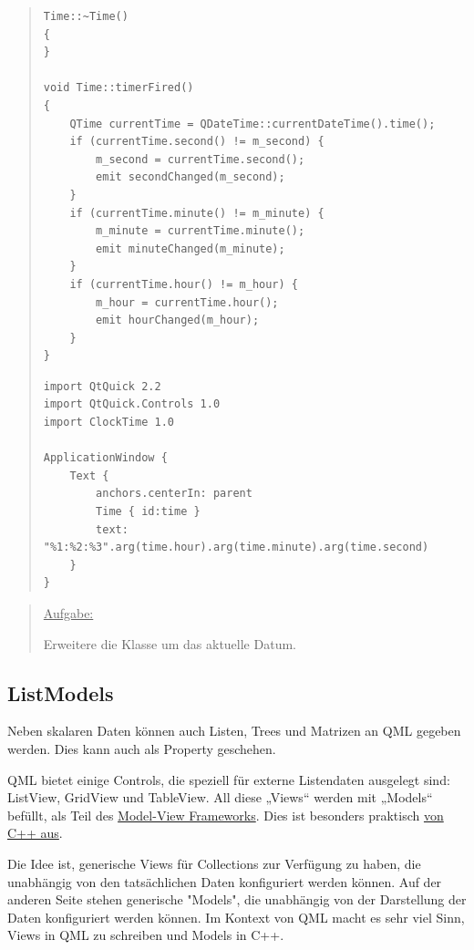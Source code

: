 \documentclass[a4paper]{article}
\begin{document}
\begin{quote}
\begin{verbatim}
Time::~Time()
{
}

void Time::timerFired()
{
    QTime currentTime = QDateTime::currentDateTime().time();
    if (currentTime.second() != m_second) {
        m_second = currentTime.second();
        emit secondChanged(m_second);
    }
    if (currentTime.minute() != m_minute) {
        m_minute = currentTime.minute();
        emit minuteChanged(m_minute);
    }
    if (currentTime.hour() != m_hour) {
        m_hour = currentTime.hour();
        emit hourChanged(m_hour);
    }
}
\end{verbatim}

\begin{verbatim}
import QtQuick 2.2
import QtQuick.Controls 1.0
import ClockTime 1.0

ApplicationWindow {
    Text {
        anchors.centerIn: parent
        Time { id:time }
        text: "%1:%2:%3".arg(time.hour).arg(time.minute).arg(time.second)
    }
}
\end{verbatim}
\end{quote}

\begin{quote}
\uline{Aufgabe:}

Erweitere die Klasse um das aktuelle Datum.
\end{quote}
\subsection{ListModels}
\label{sec-2-9}
Neben skalaren Daten können auch Listen, Trees und Matrizen an QML gegeben werden. Dies kann auch als Property geschehen.

QML bietet einige Controls, die speziell für externe Listendaten ausgelegt sind: ListView, GridView und TableView. All diese „Views“ werden mit „Models“ befüllt, als Teil des \href{https://qt-project.org/doc/qt-5.0/qtquick/qtquick-modelviewsdata-modelview.html}{Model-View Frameworks}. Dies ist besonders praktisch \href{http://qt-project.org/doc/qt-5/qtquick-modelviewsdata-cppmodels.html}{von C++ aus}.

Die Idee ist, generische Views für Collections zur Verfügung zu haben, die unabhängig von den tatsächlichen Daten konfiguriert werden können. Auf der anderen Seite stehen generische "Models", die unabhängig von der Darstellung der Daten konfiguriert werden können. Im Kontext von QML macht es sehr viel Sinn, Views in QML zu schreiben und Models in C++.
\end{document}
